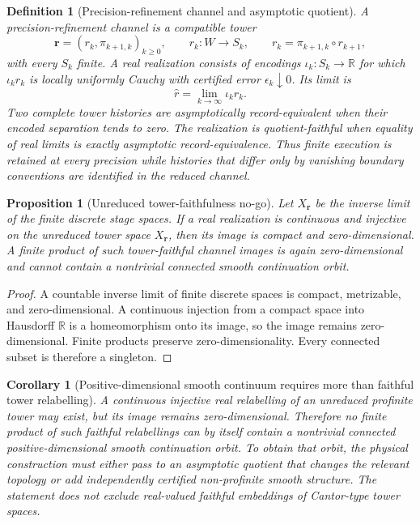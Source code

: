\documentclass[11pt]{article}
\newtheorem{proposition}[theorem]{Proposition}
\newtheorem{corollary}[theorem]{Corollary}
\newtheorem{definition}[theorem]{Definition}
\theoremstyle{remark}
\begin{document}
\begin{definition}[Precision-refinement channel and asymptotic quotient]
\label{def:precision-refinement-channel}
A \emph{precision-refinement channel} is a compatible tower
\[
\mathbf r=(r_k,\pi_{k+1,k})_{k\ge0},\qquad
r_k:W\to S_k,\qquad
r_k=\pi_{k+1,k}\circ r_{k+1},
\]
with every \(S_k\) finite. A real realization consists of encodings
\(\iota_k:S_k\to\mathbb R\) for which \(\iota_k r_k\) is locally uniformly
Cauchy with certified error \(\epsilon_k\downarrow0\). Its limit is
\[
\widehat r=\lim_{k\to\infty}\iota_k r_k.
\]
Two complete tower histories are \emph{asymptotically record-equivalent} when
their encoded separation tends to zero. The realization is
\emph{quotient-faithful} when equality of real limits is exactly asymptotic
record-equivalence. Thus finite execution is retained at every precision while
histories that differ only by vanishing boundary conventions are identified in
the reduced channel.
\end{definition}

\begin{proposition}[Unreduced tower-faithfulness no-go]
\label{prop:tower-faithful-no-go}
Let \(X_{\mathbf r}\) be the inverse limit of the finite discrete stage spaces.
If a real realization is continuous and injective on the unreduced tower space
\(X_{\mathbf r}\), then its image is compact and zero-dimensional. A finite
product of such tower-faithful channel images is again zero-dimensional and
cannot contain a nontrivial connected smooth continuation orbit.
\end{proposition}

\begin{proof}
A countable inverse limit of finite discrete spaces is compact, metrizable, and
zero-dimensional. A continuous injection from a compact space into Hausdorff
\(\mathbb R\) is a homeomorphism onto its image, so the image remains
zero-dimensional. Finite products preserve zero-dimensionality. Every connected
subset is therefore a singleton.
\end{proof}

\begin{corollary}[Positive-dimensional smooth continuum requires more than faithful tower relabelling]
\label{cor:continuum-needs-quotient}
A continuous injective real relabelling of an unreduced profinite tower may
exist, but its image remains zero-dimensional.  Therefore no finite product of
such faithful relabellings can by itself contain a nontrivial connected
positive-dimensional smooth continuation orbit.  To obtain that orbit, the
physical construction must either pass to an asymptotic quotient that changes
the relevant topology or add independently certified non-profinite smooth
structure.  The statement does not exclude real-valued faithful embeddings of
Cantor-type tower spaces.
\end{corollary}
\end{document}
